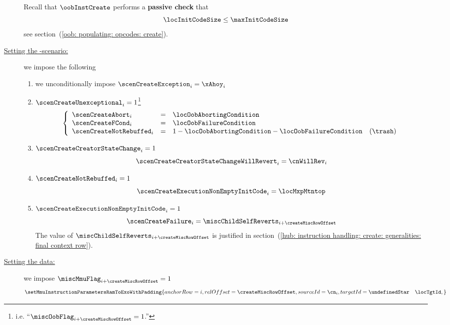 \begin{description}
		\saNote{}
		Recall that $\oobInstCreate$ performs a \textbf{passive check} that
		\[
			\locInitCodeSize \leq \maxInitCodeSize
		\]
		see section~(\ref{oob: populating: opcodes: create}).
	\item[\underline{Setting the \inst{CREATE}-scenario:}]
		\label{hub: instruction handling: create: generalities: refining the CREATE scenario}
		we impose the following
		\begin{enumerate}
			\item we unconditionally impose $\scenCreateException_{i} = \xAhoy_{i}$ \label{create: setting exceptional scenario}
			\item \If $\scenCreateUnexceptional_{i} = 1$\footnote{i.e. ``\If $\miscOobFlag_{i + \createMiscRowOffset} = 1$.''} \Then
				\[
					\left\{ \begin{array}{lclr}
						\scenCreateAbort       _{i} & = & \locOobAbortingCondition                               \\
						\scenCreateFCond       _{i} & = & \locOobFailureCondition                                \\
						\scenCreateNotRebuffed _{i} & = & 1 - \locOobAbortingCondition - \locOobFailureCondition  & (\trash) \\
					\end{array} \right.
				\]
			\item \If $\scenCreateCreatorStateChange_{i} = 1$ \Then
				\[
					\scenCreateCreatorStateChangeWillRevert_{i}
					=
					\cnWillRev_{i}
				\]
			\item \If $\scenCreateNotRebuffed _{i} = 1$ \Then
				\[
					\scenCreateExecutionNonEmptyInitCode _{i}
					=
					\locMxpMtntop
				\]
			\item \If $\scenCreateExecutionNonEmptyInitCode _{i} = 1$ \Then
				\[
					\scenCreateFailure _{i}
					=
					\miscChildSelfReverts _{i + \createMiscRowOffset}
				\]
				\saNote{}
				The value of $\miscChildSelfReverts _{i + \createMiscRowOffset}$ is justified in section~(\ref{hub: instruction handling: create: generalities: final context row}).
		\end{enumerate}
	\item[\underline{Setting the \mmuMod{} data:}]
		we impose \If $\miscMmuFlag_{i + \createMiscRowOffset} = 1$ \Then
		\[
			\setMmuInstructionParametersRamToExoWithPadding {
				anchorRow         = i                               ,
				relOffset         = \createMiscRowOffset            ,
				sourceId          = \cn_{i}                         ,
				targetId          = \undefinedStar \quad \locTgtId  ,
}\]
\end{description}
